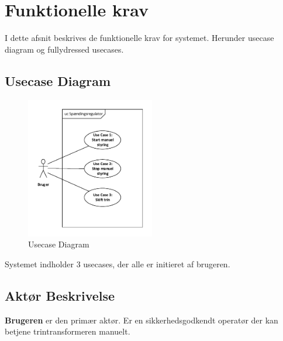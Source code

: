 
\section{Funktionelle krav}
I dette afsnit beskrives de funktionelle krav for systemet. Herunder usecase diagram og fullydressed usecases.

\subsection{Usecase Diagram}

\begin{figure}[htbp] %
	\centering
	\includegraphics[width=0.5\textwidth]{Figure/UsecaseDiagram}
	\caption{Usecase Diagram}
	\label{fig:UsecaseDiagram}
\end{figure}
Systemet indholder 3 usecases, der alle er initieret af brugeren. 

\subsection{Aktør Beskrivelse}
\textbf{Brugeren} er den primær aktør. Er en sikkerhedsgodkendt operatør der kan betjene trintransformeren manuelt.

